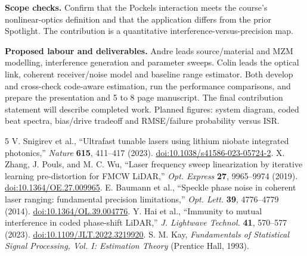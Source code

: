\documentclass[10pt,letterpaper]{article}
\begin{document}
\textbf{Scope checks.} Confirm that the Pockels interaction meets the course's nonlinear-optics definition and that the application differs from the prior Spotlight. The contribution is a quantitative interference-versus-precision map.

\textbf{Proposed labour and deliverables.} Andre leads source/material and MZM modelling, interference generation and parameter sweeps. Colin leads the optical link, coherent receiver/noise model and baseline range estimator. Both develop and cross-check code-aware estimation, run the performance comparisons, and prepare the presentation and 5 to 8 page manuscript. The final contribution statement will describe completed work. Planned figures: system diagram, coded beat spectra, bias/drive tradeoff and RMSE/failure probability versus ISR.
\begingroup\footnotesize
\begin{thebibliography}{5}\setlength{\itemsep}{2pt}
 V. Snigirev et al., ``Ultrafast tunable lasers using lithium niobate integrated photonics,'' \emph{Nature} \textbf{615}, 411--417 (2023). \href{https://doi.org/10.1038/s41586-023-05724-2}{doi:10.1038/s41586-023-05724-2}.
 X. Zhang, J. Pouls, and M. C. Wu, ``Laser frequency sweep linearization by iterative learning pre-distortion for FMCW LiDAR,'' \emph{Opt. Express} \textbf{27}, 9965--9974 (2019). \href{https://doi.org/10.1364/OE.27.009965}{doi:10.1364/OE.27.009965}.
 E. Baumann et al., ``Speckle phase noise in coherent laser ranging: fundamental precision limitations,'' \emph{Opt. Lett.} \textbf{39}, 4776--4779 (2014). \href{https://doi.org/10.1364/OL.39.004776}{doi:10.1364/OL.39.004776}.
 Y. Hai et al., ``Immunity to mutual interference in coded phase-shift LiDAR,'' \emph{J. Lightwave Technol.} \textbf{41}, 570--577 (2023). \href{https://doi.org/10.1109/JLT.2022.3219920}{doi:10.1109/JLT.2022.3219920}.
 S. M. Kay, \emph{Fundamentals of Statistical Signal Processing, Vol. I: Estimation Theory} (Prentice Hall, 1993).
\end{thebibliography}\endgroup
\end{document}

